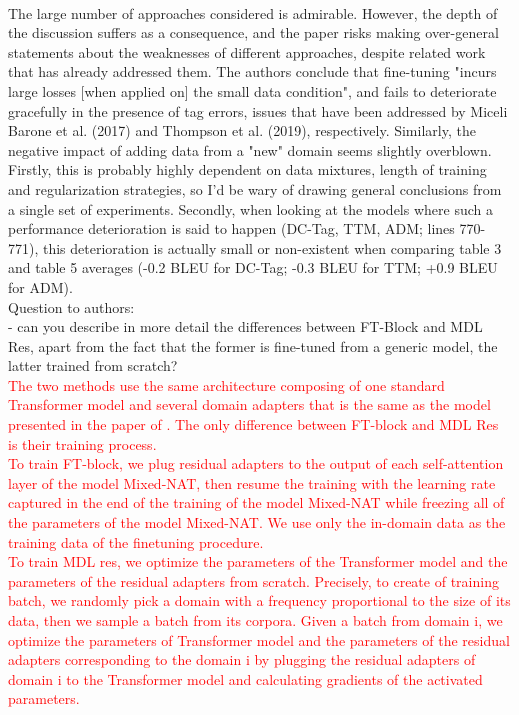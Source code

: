 \documentclass[12pt,times,a4paper,twoside]{article}
\theoremstyle{definition}
\begin{document}
\\
The large number of approaches considered is admirable. However, the depth of the discussion suffers as a consequence, and the paper risks making over-general statements about the weaknesses of different approaches, despite related work that has already addressed them. The authors conclude that fine-tuning "incurs large losses [when applied on] the small data condition", and fails to deteriorate gracefully in the presence of tag errors, issues that have been addressed by Miceli Barone et al. (2017) and Thompson et al. (2019), respectively. Similarly, the negative impact of adding data from a "new" domain seems slightly overblown. Firstly, this is probably highly dependent on data mixtures, length of training and regularization strategies, so I'd be wary of drawing general conclusions from a single set of experiments. Secondly, when looking at the models where such a performance deterioration is said to happen (DC-Tag, TTM, ADM; lines
770-771), this deterioration is actually small or non-existent when
comparing table 3 and table 5 averages (-0.2 BLEU for DC-Tag; -0.3 BLEU for TTM; +0.9 BLEU for ADM).
\\
Question to authors:
\\
- can you describe in more detail the differences between FT-Block and MDL Res, apart from the fact that the former is fine-tuned from a generic model, the latter trained from scratch?
\\
\textcolor{red}{The two methods use the same architecture composing of one standard Transformer model and several domain adapters that is the same as the model presented in the paper of \cite{Bapna19simple}. The only difference between FT-block and MDL Res is their training process.
\\
To train FT-block, we plug residual adapters to the output of each self-attention layer of the model Mixed-NAT, then resume the training with the learning rate captured in the end of the training of the model Mixed-NAT while freezing all of the parameters of the model Mixed-NAT. We use only the in-domain data as the training data of the finetuning procedure. 
\\
To train MDL res, we optimize the parameters of the Transformer model and the parameters of the residual adapters from scratch. Precisely, to create of training batch, we randomly pick a domain with a frequency proportional to the size of its data, then we sample a batch from its corpora. Given a batch from domain i, we optimize the parameters of Transformer model and the parameters of the residual adapters corresponding to the domain i by plugging the residual adapters of domain i to the Transformer model and calculating gradients of the activated parameters.}
\end{document}

